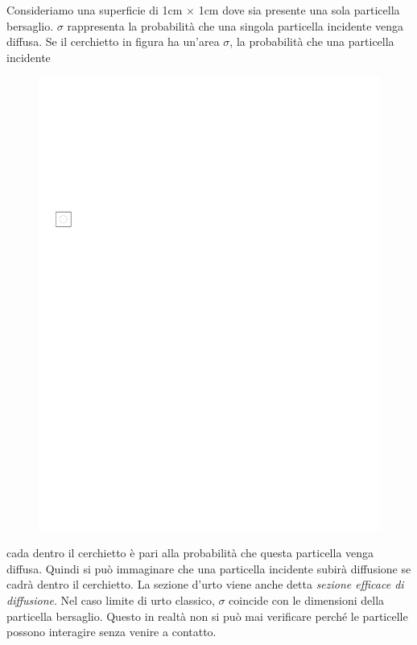 Consideriamo una superficie di 1cm $\times$ 1cm dove sia presente una sola particella bersaglio. $\sigma$ rappresenta la probabilità che una singola particella incidente venga diffusa. Se il cerchietto in figura ha un'area $\sigma$, la probabilità che una particella incidente
\begin{figure}
\includegraphics[scale=2]{img/sez_urto_p10}
\end{figure}
cada dentro il cerchietto è pari alla probabilità che questa particella venga diffusa. Quindi si può immaginare che una particella incidente subirà diffusione se cadrà dentro il cerchietto. La sezione d'urto viene anche detta \textit{sezione efficace di diffusione}. Nel caso limite di urto classico, $\sigma$ coincide con le dimensioni della particella bersaglio. Questo in realtà non si può mai verificare perché le particelle possono interagire senza venire a contatto.

